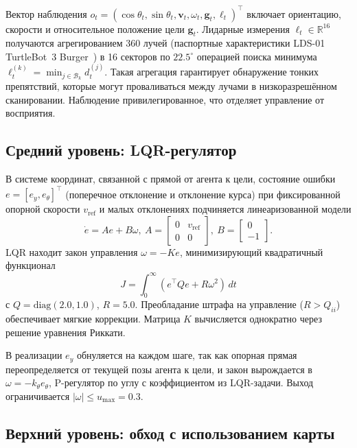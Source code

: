 \documentclass[11pt]{article}
\begin{document}
Вектор наблюдения $o_t = (\cos\theta_t, \sin\theta_t, \mathbf{v}_t, \omega_t, \mathbf{g}_t, \ell_t)^\top$ включает ориентацию, скорости и относительное положение цели $\mathbf{g}_t$. Лидарные измерения $\ell_t \in \mathbb{R}^{16}$ получаются агрегированием 360 лучей (паспортные характеристики LDS-01 TurtleBot~3 Burger~\cite{lds01_datasheet}) в 16 секторов по $22.5^\circ$ операцией поиска минимума $\ell_t^{(k)} = \min_{j \in \mathcal{B}_k} d_t^{(j)}$. Такая агрегация гарантирует обнаружение тонких препятствий, которые могут проваливаться между лучами в низкоразрешённом сканировании. Наблюдение привилегированное, что отделяет управление от восприятия.


\subsection{Средний уровень: LQR-регулятор}
\label{sec:tactical}

В системе координат, связанной с прямой от агента к цели, состояние ошибки $e = [e_y, e_\theta]^\top$ (поперечное отклонение и отклонение курса) при фиксированной опорной скорости $v_{\mathrm{ref}}$ и малых отклонениях подчиняется линеаризованной модели
\begin{equation}
\dot{e} = A e + B \omega,\ A = \begin{bmatrix} 0 & v_{\mathrm{ref}} \\ 0 & 0 \end{bmatrix},\ B = \begin{bmatrix} 0 \\ -1 \end{bmatrix}.
\end{equation}
LQR находит закон управления $\omega = -K e$, минимизирующий квадратичный функционал
\begin{equation}
J = \int_0^\infty (e^\top Q e + R \omega^2)\, dt
\end{equation}
с $Q = \mathrm{diag}(2.0, 1.0)$, $R = 5.0$. Преобладание штрафа на управление ($R > Q_{ii}$) обеспечивает мягкие коррекции. Матрица $K$ вычисляется однократно через решение уравнения Риккати.

В реализации $e_y$ обнуляется на каждом шаге, так как опорная прямая переопределяется от текущей позы агента к цели, и закон вырождается в $\omega = -k_\theta e_\theta$, P-регулятор по углу с коэффициентом из LQR-задачи. Выход ограничивается $|\omega| \leq u_{\max} = 0.3$.


\subsection{Верхний уровень: обход с использованием карты}
\label{sec:supervisory}
\end{document}
